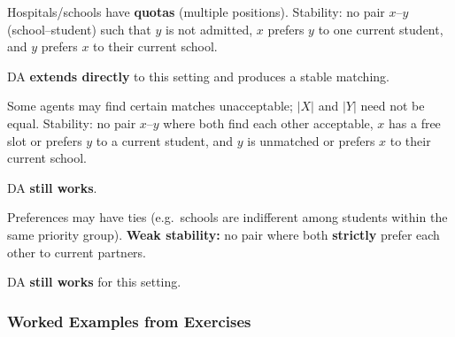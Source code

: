 \begin{defbox}
Hospitals/schools have \textbf{quotas} (multiple positions). Stability: no pair $x$--$y$ (school--student) such that $y$ is not admitted, $x$ prefers $y$ to one current student, and $y$ prefers $x$ to their current school.

DA \textbf{extends directly} to this setting and produces a stable matching.
\end{defbox}

\begin{defbox}
Some agents may find certain matches unacceptable; $|X|$ and $|Y|$ need not be equal. Stability: no pair $x$--$y$ where both find each other acceptable, $x$ has a free slot or prefers $y$ to a current student, and $y$ is unmatched or prefers $x$ to their current school.

DA \textbf{still works}.
\end{defbox}

\begin{defbox}
Preferences may have ties (e.g.\ schools are indifferent among students within the same priority group). \textbf{Weak stability:} no pair where both \textbf{strictly} prefer each other to current partners.

DA \textbf{still works} for this setting.
\end{defbox}

\bigseparator

\subsubsection{Worked Examples from Exercises}


